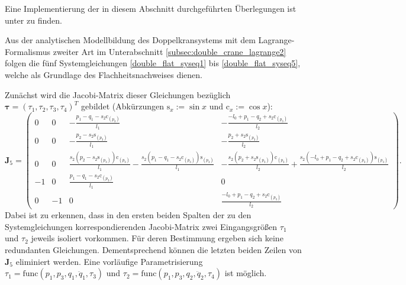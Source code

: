 Eine Implementierung der in diesem Abschnitt durchgeführten Überlegungen ist unter \cite[flatness\_notebooks/ODE\_flatness\_analysis.ipynb]{SAGithub} zu finden.

Aus der analytischen Modellbildung des Doppelkransystems mit dem Lagrange-Formalismus zweiter Art im Unterabschnitt \ref{subsec:double_crane_lagrange2} folgen die fünf Systemgleichungen \eqref{double_flat_syseq1} bis \eqref{double_flat_syseq5}, welche als Grundlage des Flachheitsnachweises dienen. 

Zunächst wird die Jacobi-Matrix dieser Gleichungen bezüglich $\boldsymbol{\tau} = (\tau_1, \tau_2, \tau_3, \tau_4)^T$ gebildet (Abkürzungen $\mathrm{s}_x := \sin{x}$ und $\mathrm{c}_x := \cos{x}$):
\begin{equation*}
	\mathbf{J}_5 = 
	\left(\begin{smallmatrix}
	0 & 0 & - \frac{p_{1} - q_{1} - s_{2} \mathrm{c}_{\left(p_{3} \right)}}{l_{1}} & - \frac{- l_{0} + p_{1} - q_{2} + s_{2} \mathrm{c}_{\left(p_{3} \right)}}{l_{2}}\\
	0 & 0 & - \frac{p_{2} - s_{2} \mathrm{s}_{\left(p_{3} \right)}}{l_{1}} & - \frac{p_{2} + s_{2} \mathrm{s}_{\left(p_{3} \right)}}{l_{2}}\\
	0 & 0 & \frac{s_{2} \left(p_{2} - s_{2} \mathrm{s}_{\left(p_{3} \right)}\right) \mathrm{c}_{\left(p_{3} \right)}}{l_{1}} - \frac{s_{2} \left(p_{1} - q_{1} - s_{2} \mathrm{c}_{\left(p_{3} \right)}\right) \mathrm{s}_{\left(p_{3} \right)}}{l_{1}} & - \frac{s_{2} \left(p_{2} + s_{2} \mathrm{s}_{\left(p_{3} \right)}\right) \mathrm{c}_{\left(p_{3} \right)}}{l_{2}} + \frac{s_{2} \left(- l_{0} + p_{1} - q_{2} + s_{2} \mathrm{c}_{\left(p_{3} \right)}\right) \mathrm{s}_{\left(p_{3} \right)}}{l_{2}}\\
	-1 & 0 & \frac{p_{1} - q_{1} - s_{2} \mathrm{c}_{\left(p_{3} \right)}}{l_{1}} & 0\\
	0 & -1 & 0 & \frac{- l_{0} + p_{1} - q_{2} + s_{2} \mathrm{c}_{\left(p_{3} \right)}}{l_{2}}
	\end{smallmatrix}\right).
\end{equation*}
Dabei ist zu erkennen, dass in den ersten beiden Spalten der zu den Systemgleichungen korrespondierenden Jacobi-Matrix zwei Eingangsgrößen $\tau_{1}$ und $\tau_{2}$ jeweils isoliert vorkommen. Für deren Bestimmung ergeben sich keine redundanten Gleichungen. Dementsprechend können die letzten beiden Zeilen von $\mathbf{J}_5$ eliminiert werden. Eine vorläufige Parametrisierung $\tau_1 = \mathrm{func}(p_1, p_3, q_1, \ddot{q}_1, \tau_3)$ und $\tau_2 = \mathrm{func}(p_1, p_3, q_2, \ddot{q}_2, \tau_4)$ ist möglich.

